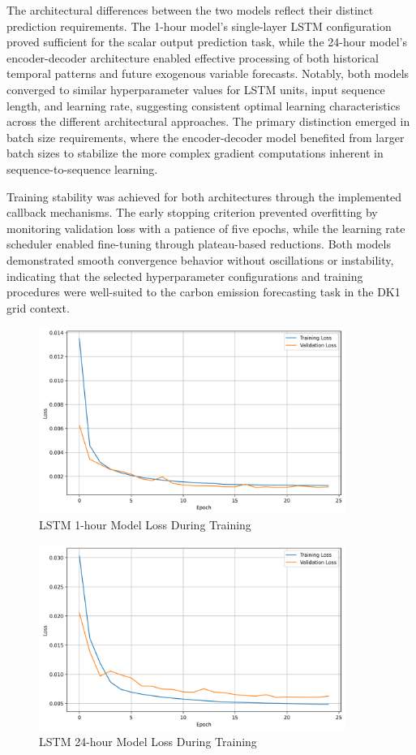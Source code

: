 The architectural differences between the two models reflect their distinct prediction requirements. The 1-hour model's single-layer LSTM configuration proved sufficient for the scalar output prediction task, while the 24-hour model's encoder-decoder architecture enabled effective processing of both historical temporal patterns and future exogenous variable forecasts. Notably, both models converged to similar hyperparameter values for LSTM units, input sequence length, and learning rate, suggesting consistent optimal learning characteristics across the different architectural approaches. The primary distinction emerged in batch size requirements, where the encoder-decoder model benefited from larger batch sizes to stabilize the more complex gradient computations inherent in sequence-to-sequence learning.

Training stability was achieved for both architectures through the implemented callback mechanisms. The early stopping criterion prevented overfitting by monitoring validation loss with a patience of five epochs, while the learning rate scheduler enabled fine-tuning through plateau-based reductions. Both models demonstrated smooth convergence behavior without oscillations or instability, indicating that the selected hyperparameter configurations and training procedures were well-suited to the carbon emission forecasting task in the DK1 grid context.

\begin{figure}[ht]
  \centering
  \includegraphics[width=10cm]{sections/figures/lstm_point_model_loss_during_training.png}
  \caption{LSTM 1-hour Model Loss During Training}
  \label{fig:lstm-point-model-loss-during-training}
\end{figure}

\begin{figure}[ht]
  \centering
  \includegraphics[width=10cm]{sections/figures/lstm_seq_model_loss_during_training.png}
  \caption{LSTM 24-hour Model Loss During Training}
  \label{fig:lstm-seq-model-loss-during-training}
\end{figure}

